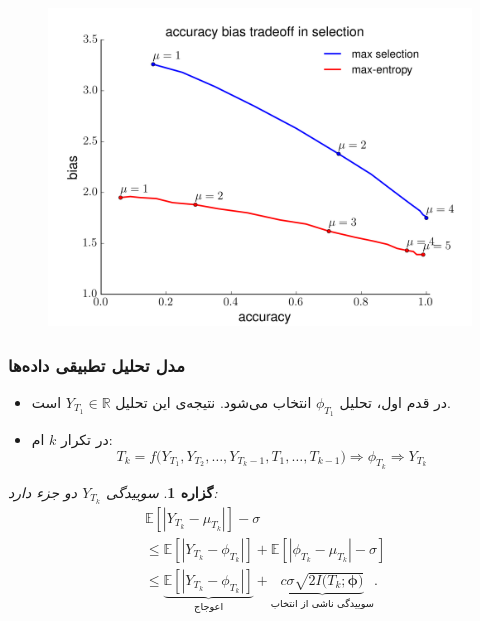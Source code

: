 \documentclass[]{beamer}
\makeatletter
\newtheorem{pro}{{\large\bf گزاره}}[section]
\newcommand{\E}{\mathbb{E}}
\newcommand{\R}{\mathbb{R}}
\newcommand{ \RTList}{\raggedleft\rightskip\@totalleftmargin}
\makeatother
\begin{document}
\begin{persian}
\begin{frame}
\begin{minipage}[t]{0.46\linewidth}
\begin{itemize}
	
\end{itemize}
\end{minipage}
\begin{minipage}[t]{0.53\linewidth}
\begin{figure}
\centering
\includegraphics[scale=0.33]{fig_3.png}
\end{figure}
\end{minipage}
\end{frame}



\begin{frame}
\frametitle{مدل تحلیل تطبیقی داده‌ها}
\begin{itemize}\RTList
	\item
	در قدم اول، تحلیل 
	$\phi_{T_1}$
انتخاب می‌شود. نتیجه‌ی این تحلیل 
	$Y_{T_1} \in \R$
است.
	\item
	در تکرار 
	$k$ ام:
	$$T_k = f\big(Y_{T_1}, Y_{T_2}, \dots, Y_{T_k-1}, T_1, \dots, T_{k-1}\big)\Rightarrow\phi_{T_k}\Rightarrow Y_{T_k}$$
\end{itemize}

{
\begin{pro}
	سوییدگی 
	$Y_{T_k}$
	دو جزء دارد:
\begin{align*}
&\E[|Y_{T_k} - \mu_{T_k}|] - \sigma \\
&\leq \E[|Y_{T_k} - \phi_{T_k}|]+ \E[|\phi_{T_k} - \mu_{T_k}|-\sigma] \\
&\leq \underbrace{\E[|Y_{T_k}-\phi_{T_k} |]}_{\text{اعوجاج}} + \underbrace{ c\sigma\sqrt{ 2I(T_k ; \bm{\phi)}}}_{\text{سوییدگی ناشی از انتخاب}}.
\end{align*}
\end{pro}
}


\end{frame}
\end{persian}
\end{document}
